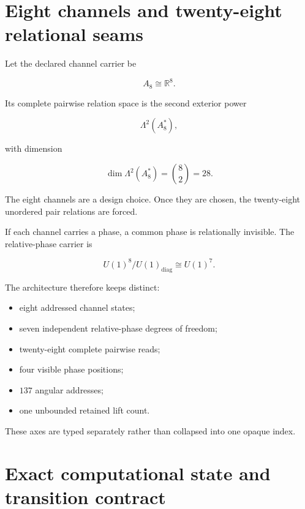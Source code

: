 \documentclass[11pt,letterpaper]{article}
\theoremstyle{clearonyx}
\newcommand{\R}{\mathbb{R}}
\newcommand{\diag}{\mathrm{diag}}
\begin{document}
\section{Eight channels and twenty-eight relational seams}

Let the declared channel carrier be

\begin{equation}
A_8\cong\R^8.
\end{equation}

Its complete pairwise relation space is the second exterior power

\begin{equation}
\Lambda^2(A_8^*),
\end{equation}

with dimension

\begin{equation}
\dim\Lambda^2(A_8^*)=\binom82=28.
\end{equation}

The eight channels are a design choice.  Once they are chosen, the twenty-eight unordered pair relations are forced.

If each channel carries a phase, a common phase is relationally invisible.  The relative-phase carrier is

\begin{equation}
U(1)^8/U(1)_{\diag}\cong U(1)^7.
\end{equation}

The architecture therefore keeps distinct:

\begin{itemize}
  \item eight addressed channel states;
  \item seven independent relative-phase degrees of freedom;
  \item twenty-eight complete pairwise reads;
  \item four visible phase positions;
  \item $137$ angular addresses;
  \item one unbounded retained lift count.
\end{itemize}

These axes are typed separately rather than collapsed into one opaque index.

\section{Exact computational state and transition contract}
\end{document}
